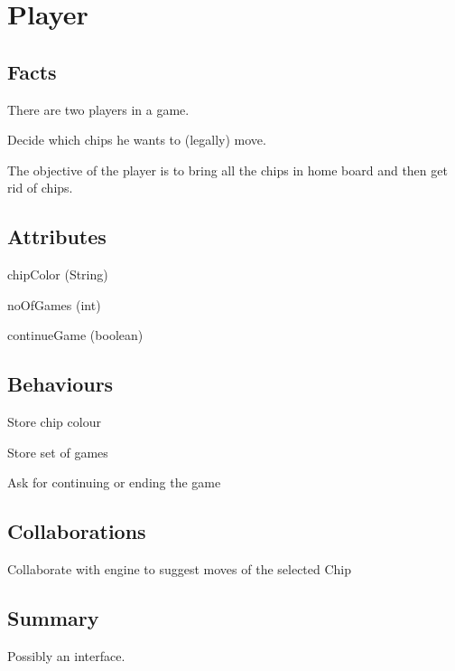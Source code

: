 \section{Player}

\subsection{Facts}

\begin{dashed}
    \item There are two players in a game.
    \item Decide which chips he wants to (legally) move.
    \item The objective of the player is to bring all the chips in home board and then get rid of chips.
\end{dashed}

\subsection{Attributes}

\begin{dashed}
    \item chipColor (String)
    \item noOfGames (int)
    \item continueGame (boolean)
\end{dashed}

\subsection{Behaviours}

\begin{dashed}
    \item Store chip colour
    \item Store set of games
    \item Ask for continuing or ending the game
\end{dashed}

\subsection{Collaborations}

\begin{dashed}
    \item Collaborate with engine to suggest moves of the selected Chip
\end{dashed}


\subsection{Summary}
Possibly an interface.
